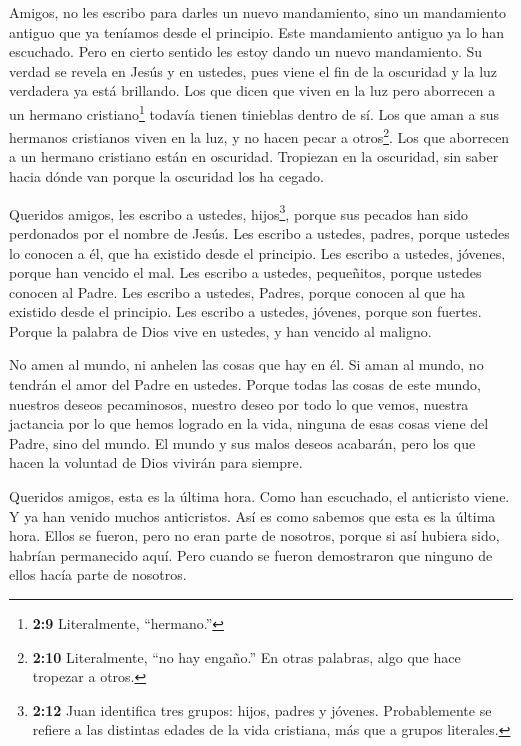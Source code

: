  Amigos, no les escribo para darles un nuevo mandamiento,
sino un mandamiento antiguo que ya teníamos desde el principio. Este
mandamiento antiguo ya lo han escuchado.  Pero en cierto
sentido les estoy dando un nuevo mandamiento. Su verdad se revela en
Jesús y en ustedes, pues viene el fin de la oscuridad y la luz verdadera
ya está brillando.  Los que dicen que viven en la luz pero
aborrecen a un hermano cristiano\footnote{\textbf{2:9} Literalmente,
  ``hermano.''} todavía tienen tinieblas dentro de sí.  Los
que aman a sus hermanos cristianos viven en la luz, y no hacen pecar a
otros\footnote{\textbf{2:10} Literalmente, ``no hay engaño.'' En otras
  palabras, algo que hace tropezar a otros.}.  Los que
aborrecen a un hermano cristiano están en oscuridad. Tropiezan en la
oscuridad, sin saber hacia dónde van porque la oscuridad los ha cegado.

 Queridos amigos, les escribo a ustedes, hijos\footnote{\textbf{2:12}
  Juan identifica tres grupos: hijos, padres y jóvenes. Probablemente se
  refiere a las distintas edades de la vida cristiana, más que a grupos
  literales.}, porque sus pecados han sido perdonados por el nombre de
Jesús.  Les escribo a ustedes, padres, porque ustedes lo
conocen a él, que ha existido desde el principio. Les escribo a ustedes,
jóvenes, porque han vencido el mal.  Les escribo a ustedes,
pequeñitos, porque ustedes conocen al Padre. Les escribo a ustedes,
Padres, porque conocen al que ha existido desde el principio. Les
escribo a ustedes, jóvenes, porque son fuertes. Porque la palabra de
Dios vive en ustedes, y han vencido al maligno.

 No amen al mundo, ni anhelen las cosas que hay en él. Si
aman al mundo, no tendrán el amor del Padre en ustedes. 
Porque todas las cosas de este mundo, nuestros deseos pecaminosos,
nuestro deseo por todo lo que vemos, nuestra jactancia por lo que hemos
logrado en la vida, ninguna de esas cosas viene del Padre, sino del
mundo.  El mundo y sus malos deseos acabarán, pero los que
hacen la voluntad de Dios vivirán para siempre.

 Queridos amigos, esta es la última hora. Como han
escuchado, el anticristo viene. Y ya han venido muchos anticristos. Así
es como sabemos que esta es la última hora.  Ellos se
fueron, pero no eran parte de nosotros, porque si así hubiera sido,
habrían permanecido aquí. Pero cuando se fueron demostraron que ninguno
de ellos hacía parte de nosotros.

